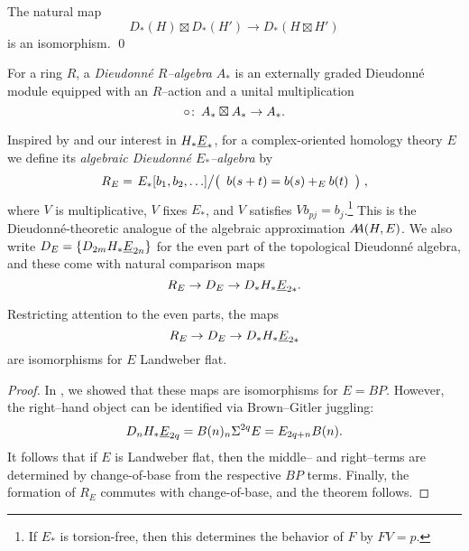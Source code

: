 \begin{lemma}
The natural map \[D_*(H) \boxtimes D_*(H') \to D_*(H \boxtimes H')\] is an isomorphism. \qed
\end{lemma}

\begin{definition}
For a ring \(R\), a \textit{Dieudonn\'e \(R\)--algebra} \(A_*\) is an externally graded Dieudonn\'e module equipped with an \(R\)--action and a unital multiplication \[\circ\co A_* \boxtimes A_* \to A_*.\]
\end{definition}

\begin{example}
Inspired by  and our interest in \(H_* \OS{E}{*}\), for a complex-oriented homology theory \(E\) we define its \textit{algebraic Dieudonn\'e \(E_*\)--algebra} by \[R_E = \left. E_*[b_1, b_2, \ldots] \middle/ \left( \begin{array}{c} b(s+t) = b(s) +_E b(t) \end{array} \right) \right.,\] where \(V\) is multiplicative, \(V\) fixes \(E_*\), and \(V\) satisfies \(Vb_{pj} = b_j\).\footnote{If \(E_*\) is torsion-free, then this determines the behavior of \(F\) by \(FV = p\).}  This is the Dieudonn\'e-theoretic analogue of the algebraic approximation \(\AA(H, E)\).  We also write \(D_E = \{D_{2m} H_* \OS{E}{2n}\}\) for the even part of the topological Dieudonn\'e algebra, and these come with natural comparison maps \[R_E \to D_E \to D_* H_* \OS{E}{2*}.\]
\end{example}

\begin{theorem}\label{LandweberFlatUnstableCoopns}
Restricting attention to the even parts, the maps \[R_E \to D_E \to D_* H_* \OS{E}{2*}\] are isomorphisms for \(E\) Landweber flat.
\end{theorem}
\begin{proof}
In , we showed that these maps are isomorphisms for \(E = BP\).  However, the right--hand object can be identified via Brown--Gitler juggling: \[D_n H_* \OS{E}{2q} = B(n)_n \Susp^{2q} E = E_{2q+n} B(n).\]  It follows that if \(E\) is Landweber flat, then the middle-- and right--terms are determined by change-of-base from the respective \(BP\) terms.  Finally, the formation of \(R_E\) commutes with change-of-base, and the theorem follows.
\end{proof}

